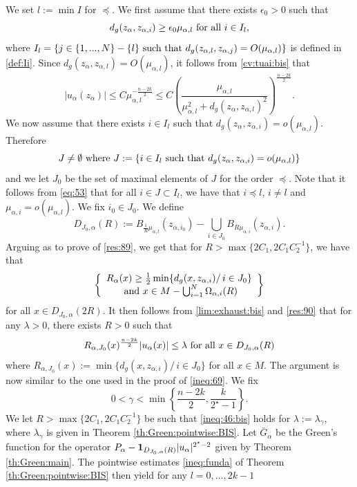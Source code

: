 \documentclass[reqno]{amsart}
\def \eps {\epsilon}
\def \crit {2^\star}
\def \ua {u_\alpha}
\def \za {z_\alpha}
\def \mai {\mu_{\alpha,i}}
\def \zai {z_{\alpha,i}}
\def \zaj {z_{\alpha,j}}
\def \zal {z_{\alpha,l}}
\def \mal {\mu_{\alpha,l}}
\begin{document}
\smallskip\noindent We set $l:=\min I$ for  $\preceq$.  We first assume that there exists $\eps_0>0$ such that
\begin{equation}\label{choice:3}
d_g(\za,\zai)\geq \eps_0\mal\hbox{ for all }i\in I_l,
\end{equation}
where $I_l=\{j\in\{1,...,N\}-\{l\}\hbox{ such that }d_g(\zal,\zaj)=O(\mal)\}$ is defined in \eqref{def:Ii}.  Since $d_g(\za,\zal)=O(\mal)$, it   follows from \eqref{cv:tuai:bis} that
\begin{equation}\label{ineq:110}
|\ua(\za)|\leq C\mal^{-\frac{n-2k}{2}}\leq C\left(\frac{\mal}{\mal^2+d_g(\za,\zal)^2}\right)^{\frac{n-2k}{2}}.
\end{equation}
We now assume that  there exists $i\in I_l$ such that $d_g(\za,\zai)=o(\mal)$. Therefore
\begin{equation*}
J\neq \emptyset\hbox{ where }J:=\{i\in I_l\hbox{ such that }d_g(\za,\zai)=o(\mal)\}
\end{equation*}
and we let $J_0$ be the set of maximal elements of $J$ for the order $\preceq$. Note that it follows from \eqref{eq:53} that for all $i\in J\subset I_l$, we have that $i\preceq l$, $i\neq l$ and $\mai=o(\mal)$. We  fix $i_0\in J_0$. We define
$$D_{J_0,\alpha}(R):=B_{\frac{1}{R}\mal}(z_{\alpha, i_0})-\bigcup_{i\in J_0}B_{R\mai}(\zai).$$
Arguing as to prove of \eqref{res:89}, we get that for $R>\max\{2C_1, 2C_1 C_2^{-1}\}$, we have that 
\begin{equation}\left\{\begin{array}{c}
R_\alpha(x)\geq \frac{1}{2}\min\{d_g(x,\zai)/\, i\in J_0\}\\
\hbox{ and }x\in M-\bigcup_{i=1}^N\Omega_{\alpha, i}(R)\end{array}\right\}\label{res:90}
\end{equation}
for all $x\in D_{J_0,\alpha}(2R)$. It then follows from \eqref{lim:exhaust:bis} and \eqref{res:90} that for any $\lambda>0$, there exists $R>0$ such that
\begin{equation}\label{ineq:46:bis}
R_{\alpha, J_0}(x)^{\frac{n-2k}{2}}|\ua(x)|\leq \lambda\hbox{ for all }x\in D_{J_0,\alpha}(R)
\end{equation}
where $R_{\alpha, J_0}(x):=\min\{d_g(x,\zai)/\, i\in J_0\}$ for all $x\in M$. The argument is now similar to the one used in the proof of \eqref{ineq:69}.  We fix $$0<\gamma<\min\left\{\frac{n-2k}{2},\frac{k}{\crit-1}\right\}.$$
We let $R>\max\{2C_1,2C_1 C_2^{-1}\}$ be such that \eqref{ineq:46:bis} holds for $\lambda:=\lambda_\gamma$, where $\lambda_\gamma$ is given in Theorem \ref{th:Green:pointwise:BIS}. Let $\bar{G}_\alpha$ be the Green's function for the operator $P_\alpha-  {\bf 1}_{D_{J_0,\alpha}(R)}|\ua|^{\crit-2}$ given by Theorem \ref{th:Green:main}. The pointwise estimates \eqref{ineq:funda} of Theorem \ref{th:Green:pointwise:BIS} then yield for any $l=0,...,2k-1$
\end{document}
